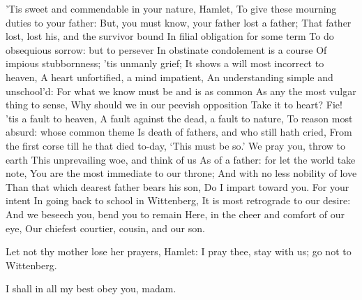 \documentclass[11pt]{book}
\begin{document}
\2	'Tis sweet and commendable in your nature, Hamlet,
	To give these mourning duties to your father:
	But, you must know, your father lost a father;
	That father lost, lost his, and the survivor bound
	In filial obligation for some term
	To do obsequious sorrow: but to persever
	In obstinate condolement is a course
	Of impious stubbornness; 'tis unmanly grief;
	It shows a will most incorrect to heaven,
	A heart unfortified, a mind impatient,
	An understanding simple and unschool'd:
	For what we know must be and is as common
	As any the most vulgar thing to sense,
	Why should we in our peevish opposition
	Take it to heart? Fie! 'tis a fault to heaven,
	A fault against the dead, a fault to nature,
	To reason most absurd: whose common theme
	Is death of fathers, and who still hath cried,
	From the first corse till he that died to-day,
	`This must be so.' We pray you, throw to earth
	This unprevailing woe, and think of us
	As of a father: for let the world take note,
	You are the most immediate to our throne;
	And with no less nobility of love
	Than that which dearest father bears his son,
	Do I impart toward you. For your intent
	In going back to school in Wittenberg,
	It is most retrograde to our desire:
	And we beseech you, bend you to remain
	Here, in the cheer and comfort of our eye,
	Our chiefest courtier, cousin, and our son.

\3	Let not thy mother lose her prayers, Hamlet:
	I pray thee, stay with us; go not to Wittenberg.

\1	I shall in all my best obey you, madam.
\end{document}
